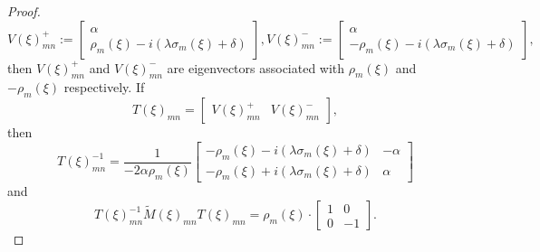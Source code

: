 \documentclass[sn-mathphys-num]{sn-jnl}%
\numberwithin{equation}{section}
\theoremstyle{thmstyleone}
\theoremstyle{thmstyletwo}
\theoremstyle{thmstylethree}
\begin{document}
\begin{proof}
$$V(\xi)_{mn}^+:= \left[ \begin{array}{c} \alpha \\ \rho_m(\xi)-i(\lambda \sigma_m(\xi)+\delta) \end{array} \right], V(\xi)_{mn}^-:= \left[ \begin{array}{c} \alpha \\ -\rho_m(\xi)-i(\lambda \sigma_m(\xi)+\delta) \end{array} \right],$$
then $V(\xi)_{mn}^+$ and $V(\xi)_{mn}^-$ are eigenvectors associated with $\rho_m(\xi)$ and $-\rho_m(\xi)$ respectively. 
If
$$T(\xi)_{mn} = \left[ \begin{array}{c|c} V(\xi)_{mn}^+ & V(\xi)_{mn}^- \end{array} \right],$$
then
\begin{equation} T(\xi)_{mn}^{-1} =\frac{1}{-2\alpha \rho_m(\xi)} \left[ \begin{array}{cr} -\rho_m(\xi)-i(\lambda \sigma_m(\xi)+\delta) & -\alpha \\ -\rho_m(\xi)+i(\lambda \sigma_m(\xi)+\delta) & \alpha \end{array} \right]
\end{equation}
and
\begin{equation}T(\xi)_{mn}^{-1}\widetilde{M}(\xi)_{mn}T(\xi)_{mn} = \rho_m(\xi) \cdot \left[ \begin{array}{cr} 1 & 0 \\ 0 & -1 \end{array}\right].\end{equation}


\end{proof}
\end{document}
